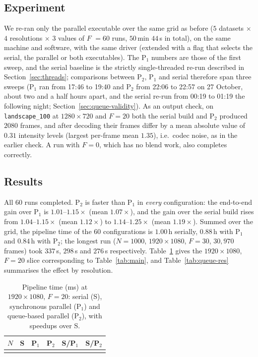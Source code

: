 \documentclass[conference]{IEEEtran}
\begin{document}
\subsection{Experiment}
We re-ran only the parallel executable over the same grid as before ($5$ datasets $\times$ $4$ resolutions $\times$ $3$ values of $F$ $=60$ runs, $50$\,min $44$\,s in total), on the same machine and software, with the same driver (extended with a flag that selects the serial, the parallel or both executables). The P$_1$ numbers are those of the first sweep, and the serial baseline is the strictly single-threaded re-run described in Section~\ref{sec:threads}; comparisons between P$_2$, P$_1$ and serial therefore span three sweeps (P$_1$ ran from 17:46 to 19:40 and P$_2$ from 22:06 to 22:57 on 27 October, about two and a half hours apart, and the serial re-run from 00:19 to 01:19 the following night; Section~\ref{sec:queue-validity}). As an output check, on \texttt{landscape\_100} at $1280\times720$ and $F{=}20$ both the serial build and P$_2$ produced $2080$ frames, and after decoding their frames differ by a mean absolute value of $0.31$ intensity levels (largest per-frame mean $1.35$), i.e.\ codec noise, as in the earlier check. A run with $F{=}0$, which has no blend work, also completes correctly.

\subsection{Results}
All $60$ runs completed. P$_2$ is faster than P$_1$ in \emph{every} configuration: the end-to-end gain over P$_1$ is $1.01$--$1.15\times$ (mean $1.07\times$), and the gain over the serial build rises from $1.04$--$1.15\times$ (mean $1.12\times$) to $1.14$--$1.25\times$ (mean $1.19\times$). Summed over the grid, the pipeline time of the $60$ configurations is $1.00$\,h serially, $0.88$\,h with P$_1$ and $0.84$\,h with P$_2$; the longest run ($N{=}1000$, $1920\times1080$, $F{=}30$, $30{,}970$ frames) took $337$\,s, $298$\,s and $276$\,s respectively. Table~\ref{tab:queue-main} gives the $1920\times1080$, $F{=}20$ slice corresponding to Table~\ref{tab:main}, and Table~\ref{tab:queue-res} summarises the effect by resolution.

\begin{table}[t]
\caption{Pipeline time (ms) at $1920\times1080$, $F{=}20$: serial (S), synchronous parallel (P$_1$) and queue-based parallel (P$_2$), with speedups over S.}
\label{tab:queue-main}
\centering
\footnotesize
\setlength{\tabcolsep}{3.2pt}
\begin{tabular}{@{}rrrrrr@{}}
\toprule
$N$ & S & P$_1$ & P$_2$ & S/P$_1$ & S/P$_2$ \\
\midrule
\\
\bottomrule
\end{tabular}
\end{table}
\end{document}
